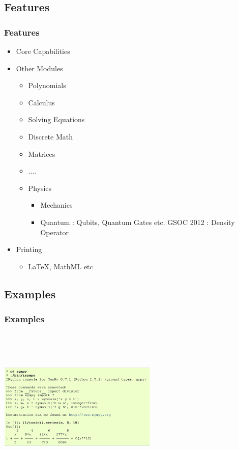 \documentclass[dvips]{beamer}
\begin{document}
\subsection{Features}
\begin{frame}
\frametitle{Features}

\begin{itemize}
\item Core Capabilities
\item Other Modules
  \begin{itemize}
     \item Polynomials
     \item Calculus
     \item Solving Equations
     \item Discrete Math
     \item Matrices
     \item ....
     \item Physics
        \begin{itemize}
              \item Mechanics
              \item Quantum : Qubits, Quantum Gates etc.  GSOC 2012 : Density Operator
        \end{itemize}
  \end{itemize}
\item Printing
  \begin{itemize}
    \item \LaTeX, MathML etc
  \end{itemize}
 \end{itemize}
\end{frame}


\subsection{Examples}
\begin{frame}
\frametitle{Examples}
\includegraphics[height=3in,width=3in]{ex1.ps}
\end{frame}
\end{document}
